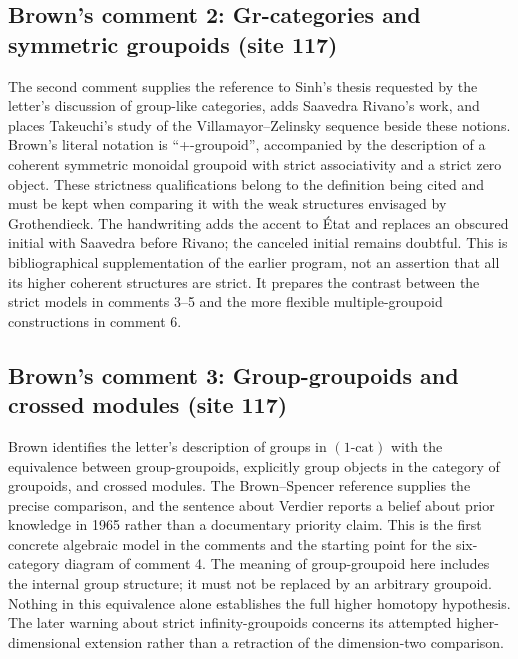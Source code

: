 \documentclass[10pt,oneside]{book}
\begin{document}
\subsection*{Brown's comment 2: Gr-categories and symmetric groupoids (site 117)}
The second comment supplies the reference to Sinh's thesis requested by the letter's discussion of group-like categories, adds Saavedra Rivano's work, and places Takeuchi's study of the Villamayor--Zelinsky sequence beside these notions. Brown's literal notation is ``+-groupoid'', accompanied by the description of a coherent symmetric monoidal groupoid with strict associativity and a strict zero object. These strictness qualifications belong to the definition being cited and must be kept when comparing it with the weak structures envisaged by Grothendieck. The handwriting adds the accent to État and replaces an obscured initial with Saavedra before Rivano; the canceled initial remains doubtful. This is bibliographical supplementation of the earlier program, not an assertion that all its higher coherent structures are strict. It prepares the contrast between the strict models in comments 3--5 and the more flexible multiple-groupoid constructions in comment 6.

\subsection*{Brown's comment 3: Group-groupoids and crossed modules (site 117)}
Brown identifies the letter's description of groups in $(1\text{-cat})$ with the equivalence between group-groupoids, explicitly group objects in the category of groupoids, and crossed modules. The Brown--Spencer reference supplies the precise comparison, and the sentence about Verdier reports a belief about prior knowledge in 1965 rather than a documentary priority claim. This is the first concrete algebraic model in the comments and the starting point for the six-category diagram of comment 4. The meaning of group-groupoid here includes the internal group structure; it must not be replaced by an arbitrary groupoid. Nothing in this equivalence alone establishes the full higher homotopy hypothesis. The later warning about strict infinity-groupoids concerns its attempted higher-dimensional extension rather than a retraction of the dimension-two comparison.
\end{document}
